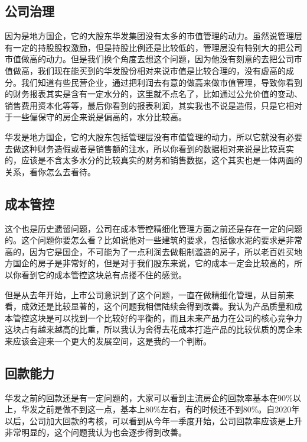 \documentclass[a4paper,12pt,lang=cn,fontset = windows]{elegantpaper} %
\begin{document}
\subsection{公司治理}

因为是地方国企，它的大股东华发集团没有太多的市值管理的动力。虽然说管理层有一定的持股股权激励，但是持股比例还是比较低的，管理层没有特别大的把公司市值做高的动力。但是我们换个角度去想这个问题，因为他没有刻意的去把公司市值做高，我们现在能买到的华发股份相对来说市值是比较合理的，没有虚高的成分。我们知道有些民营企业，通过把利润去有意的做高来做市值管理，导致你看到的财务报表其实是含有一定水分的，这里就不点名了，比如通过公允价值的变动、销售费用资本化等等，最后你看到的报表利润，其实我也不说是造假，只是它相对于一些偏保守的房企来说是偏高的，水分比较高。

华发是地方国企，它的大股东包括管理层没有市值管理的动力，所以它就没有必要去做这种财务造假或者是销售额的注水，所以你看到的数据相对来说是比较真实的，应该是不含太多水分的比较真实的财务和销售数据，这个其实也是一体两面的关系，看你怎么去看待。



\subsection{成本管控}

这个也是历史遗留问题，公司在成本管控精细化管理方面之前还是存在一定的问题的。这个问题你要怎么看？比如说他对一些建筑的要求，包括像水泥的要求是非常高的，因为它是国企，不可能为了一点利润去做粗制滥造的房子，所以老百姓买地方国企的房子是非常好的，但是对于我们股东来说，它的成本一定会比较高的，所以你看到它的成本管控这块总有点搂不住的感觉。

但是从去年开始，上市公司意识到了这个问题，一直在做精细化管理，从目前来看，成效还是比较显著的，这个问题我相信陆续会得到改善。我认为产品质量和成本管控这块是可以找到一个比较好的平衡的，而且未来产品力在公司的核心竞争力这块占有越来越高的比重，所以我认为舍得去花成本打造产品的比较优质的房企未来应该会迎来一个更大的发展空间，这是我的一个判断。



\subsection{回款能力}

华发之前的回款还是有一定问题的，大家可以看到主流房企的回款率基本在90\%以上，华发之前是做不到这一点，基本上80\%左右，有的时候还不到80\%。自2020年以后，公司加大回款的考核，可以看到从今年一季度开始，公司回款率应该是上升非常明显的，这个问题我认为也会逐步得到改善。
\end{document}
